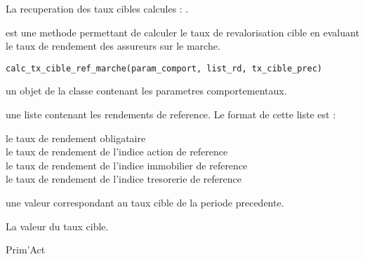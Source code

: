 \documentclass[a4paper]{book}
\begin{document}
%
\begin{SeeAlso}\relax
La recuperation des taux cibles calcules : .
\end{SeeAlso}
%
\begin{Description}\relax
{} est une methode permettant de calculer le taux de revalorisation cible
en evaluant le taux de rendement des assureurs sur le marche.
\end{Description}
%
\begin{Usage}
\begin{verbatim}
calc_tx_cible_ref_marche(param_comport, list_rd, tx_cible_prec)
\end{verbatim}
\end{Usage}
%
\begin{Arguments}
\begin{ldescription}
\item[\code{param\_comport}] un objet de la classe  contenant les parametres
comportementaux.

\item[\code{list\_rd}] une liste contenant les rendements de reference. Le format de cette liste est :
\begin{description}

\item[le taux de rendement obligataire] 
\item[le taux de rendement de l'indice action de reference] 
\item[le taux de rendement de l'indice immobilier de reference] 
\item[le taux de rendement de l'indice tresorerie de reference] 

\end{description}


\item[\code{tx\_cible\_prec}] une valeur  correspondant au taux cible de la periode precedente.
\end{ldescription}
\end{Arguments}
%
\begin{Value}
La valeur du taux cible.
\end{Value}
%
\begin{Author}\relax
Prim'Act
\end{Author}
\end{document}
